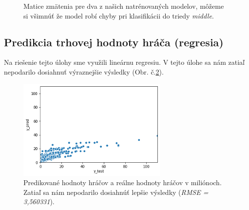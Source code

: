 \documentclass[runningheads]{llncs}
\begin{document}
\begin{figure}%
    \centering
    \qquad
    \caption{Matice zmätenia pre dva z našich natrénovaných modelov, môžeme si všimnúť že model robí chyby pri klasifikácii do triedy \textit{middle}.}%
    \label{fig:confusion_matrix_position_4}%
\end{figure}

\subsection{Predikcia trhovej hodnoty hráča (regresia)}

Na riešenie tejto úlohy sme využili lineárnu regresiu. V tejto úlohe sa nám zatiaľ nepodarilo dosiahnuť výraznejšie výsledky (Obr. č.\ref{fig:value_pred_true_scatterplot}).

\begin{figure}[htp]
    \centering
    \includegraphics[height=5cm]{images/value_pred_true_scatterplot}
    \caption{Predikované hodnoty hráčov a reálne hodnoty hráčov v miliónoch. Zatiaľ sa nám nepodarilo dosiahnúť lepšie výsledky (\textit{RMSE = 3,560331}).}
    \label{fig:value_pred_true_scatterplot}
\end{figure}
\end{document}
